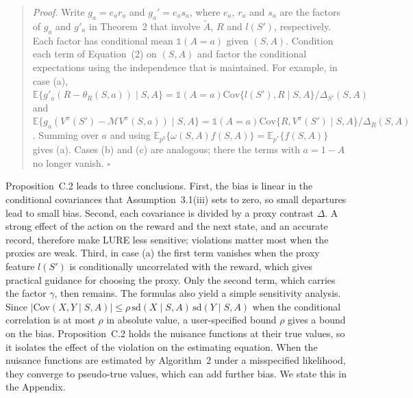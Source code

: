 \documentclass[12pt]{article}
\newcommand{\Cov}{{\mbox{Cov}}}
\newcommand{\0}{\boldsymbol{0}}
\theoremstyle{definition}
\newcommand{\E}{\mathbb{E}}
\newenvironment{reproducedtext}{\begin{quote}\small}{\end{quote}}
\begin{document}
\begin{reproducedtext}
\textit{Proof.} Write $g_a=e_a r_a$ and $g_a'=e_a s_a$, where $e_a$, $r_a$ and $s_a$ are the factors of $g_a$ and $g'_a$ in Theorem~2 that involve $\widetilde A$, $R$ and $l(S')$, respectively. Each factor has conditional mean $\mathds 1(A=a)$ given $(S,A)$. Condition each term of Equation~(2) on $(S,A)$ and factor the conditional expectations using the independence that is maintained. For example, in case (a), $\E\{g'_a(R-\theta_R(S,a))\mid S,A\}=\mathds 1(A=a)\Cov\{l(S'),R\mid S,A\}/\Delta_{S'}(S,A)$ and $\E\{g_a(V^\pi(S')-\mathcal MV^\pi(S,a))\mid S,A\}=\mathds 1(A=a)\Cov\{R,V^\pi(S')\mid S,A\}/\Delta_{R}(S,A)$. Summing over $a$ and using $\E_{p^b}\{\omega(S,A)f(S,A)\}=\E_{p^*}\{f(S,A)\}$ gives (a). Cases (b) and (c) are analogous; there the terms with $a=1-A$ no longer vanish. \hfill$\square$
\end{reproducedtext}
Proposition~C.2 leads to three conclusions. First, the bias is linear in the conditional covariances that Assumption~3.1(iii) sets to zero, so small departures lead to small bias. Second, each covariance is divided by a proxy contrast $\Delta$. A strong effect of the action on the reward and the next state, and an accurate record, therefore make LURE less sensitive; violations matter most when the proxies are weak. Third, in case (a) the first term vanishes when the proxy feature $l(S')$ is conditionally uncorrelated with the reward, which gives practical guidance for choosing the proxy. Only the second term, which carries the factor $\gamma$, then remains. The formulas also yield a simple sensitivity analysis. Since $|\Cov(X,Y\mid S,A)|\le\rho\,\mathrm{sd}(X\mid S,A)\,\mathrm{sd}(Y\mid S,A)$ when the conditional correlation is at most $\rho$ in absolute value, a user-specified bound $\rho$ gives a bound on the bias. Proposition~C.2 holds the nuisance functions at their true values, so it isolates the effect of the violation on the estimating equation. When the nuisance functions are estimated by Algorithm~2 under a misspecified likelihood, they converge to pseudo-true values, which can add further bias. We state this in the Appendix.
\end{document}

